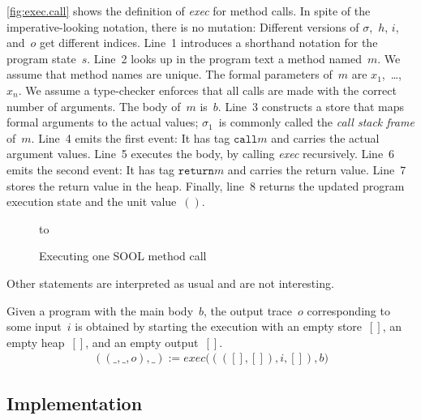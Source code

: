 \documentclass[preprint]{sigplanconf} %
\theoremstyle{definition}
\theoremstyle{remark}
\begin{document}
\autoref{fig:exec.call} shows the definition of \textit{exec} for method calls.
In spite of the imperative-looking notation, there is no mutation:
Different versions of $\sigma$,~$h$, $i$, and~$o$ get different indices.
Line~1 introduces a shorthand notation for the program state~$s$.
Line~2 looks up in the program text a method named~$m$.
We assume that method names are unique.
The formal parameters of~$m$ are $x_1$,~\dots,~$x_n$.
We assume a type-checker enforces that all calls are made with the correct number of arguments.
The body of~$m$ is~$b$.
Line~3 constructs a store that maps formal arguments to the actual values;
$\sigma_1$~is commonly called the \emph{call stack frame} of~$m$.
Line~4 emits the first event:
It has tag $\mathtt{call}m$ and carries the actual argument values.
Line~5 executes the body, by calling \textit{exec} recursively.
Line~6 emits the second event:
It has tag $\mathtt{return}m$ and carries the return value.
Line~7 stores the return value in the heap.
Finally, line~8 returns the updated program execution state and the unit value~$()$.

\begin{figure}
\hbox to
\caption{Executing one SOOL method call}
\label{fig:exec.call}
\end{figure}

Other statements are interpreted as usual and are not interesting.

Given a program with the main body~$b$, the output trace~$o$ corresponding to some input~$i$ is obtained by starting the execution with an empty store~$[]$, an empty heap~$[]$, and an empty output~$[]$.
\begin{align}
((\_,\_,o),\_):=\mathit{exec}\bigl((([],[]),i,[]),b\bigr)
\end{align}

\subsection{Implementation}\label{sec:implementation} %
\end{document}
